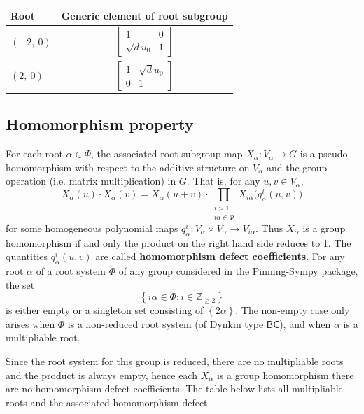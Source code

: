 \documentclass[11pt]{article}
\newcommand{\noi}{\noindent}
\newcommand{\tbf}{\textbf}
\newcommand{\lb}{\left\{}
\newcommand{\rb}{\right\}}
\newcommand{\Z}{\mathbb{Z}}
\theoremstyle{definition}
\newif\ifrootsystemreduced
\begin{document}
\noindent \begin{longtable}{|l|c|}
    \hline
    \textbf{Root} & \textbf{Generic element of root subgroup} \\
    \hline
    \endhead
    $\left( -2, \  0\right)$ & ${\left[\begin{matrix}1 & 0\\\sqrt{d} u_{0} & 1\end{matrix}\right]}$ \\
    \hline
    $\left( 2, \  0\right)$ & ${\left[\begin{matrix}1 & \sqrt{d} u_{0}\\0 & 1\end{matrix}\right]}$ \\
    \hline
\end{longtable}


\subsection{Homomorphism property}

\noi For each root $\alpha \in \Phi$, the associated root subgroup map $X_\alpha:V_\alpha \to G$ is a pseudo-homomorphism with respect to the additive structure on $V_\alpha$ and the group operation (i.e. matrix multiplication) in $G$. That is, for any $u,v \in V_\alpha$,
\begin{equation}
\label{pseudo homomorphism}
	X_\alpha(u) \cdot X_\alpha(v) = X_\alpha(u+v) \cdot \prod_{\substack{i > 1 \\ i \alpha \in \Phi}} X_{i \alpha} \Big( q^i_\alpha(u,v) \Big)
\end{equation}
for some homogeneous polynomial maps $q^i_\alpha:V_\alpha \times V_\alpha \to V_{i \alpha}$. Thus $X_\alpha$ is a group homomorphism if and only the product on the right hand side reduces to 1. The quantities $q^i_\alpha(u,v)$ are called \tbf{homomorphism defect coefficients}. For any root $\alpha$ of a root system $\Phi$ of any group considered in the Pinning-Sympy package, the set
\[
	\lb i \alpha \in \Phi : i \in \Z_{\ge 2} \rb
\]
is either empty or a singleton set consisting of $\lb 2 \alpha \rb$. The non-empty case only arises when $\Phi$ is a non-reduced root system (of Dynkin type $\mathsf{BC}$), and when $\alpha$ is a multipliable root. 

\ifrootsystemreduced
Since the root system for this group is reduced, there are no multipliable roots and the product is always empty, hence each $X_\alpha$ is a group homomorphism there are no homomorphism defect coefficients.
\else
The table below lists all multipliable roots and the associated homomorphism defect.
\end{document}
